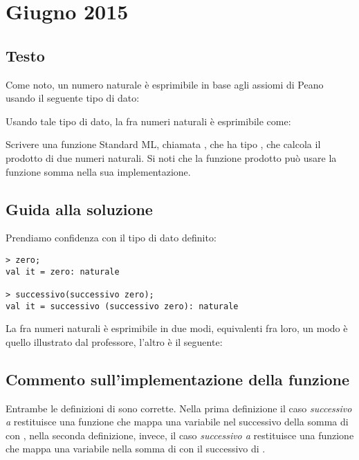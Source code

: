 \section{Giugno 2015}

\subsection{Testo}

Come noto, un numero naturale è esprimibile in base agli assiomi di Peano usando il seguente tipo di dato:


Usando tale tipo di dato, la  fra numeri naturali è esprimibile come:



Scrivere una funzione Standard ML, chiamata , che ha tipo , che calcola il prodotto di due numeri naturali. Si noti che la funzione prodotto può usare la funzione somma nella sua implementazione.

\subsection{Guida alla soluzione}

Prendiamo confidenza con il tipo di dato definito:
\begin{lstlisting}[style = SML, caption = {Dichiarazione di numeri naturali}]
> zero;
val it = zero: naturale

> successivo(successivo zero);
val it = successivo (successivo zero): naturale
\end{lstlisting}

La  fra numeri naturali è esprimibile in due modi, equivalenti fra loro, un modo è quello illustrato dal professore, l'altro è il seguente:


\subsection{Commento sull'implementazione della funzione }

Entrambe le definizioni di  sono corrette. Nella prima definizione il caso \emph{successivo a} restituisce una funzione che mappa una variabile  nel successivo della somma di  con , nella seconda definizione, invece, il caso \emph{successivo a} restituisce una funzione che mappa una variabile  nella somma di  con il successivo di .

